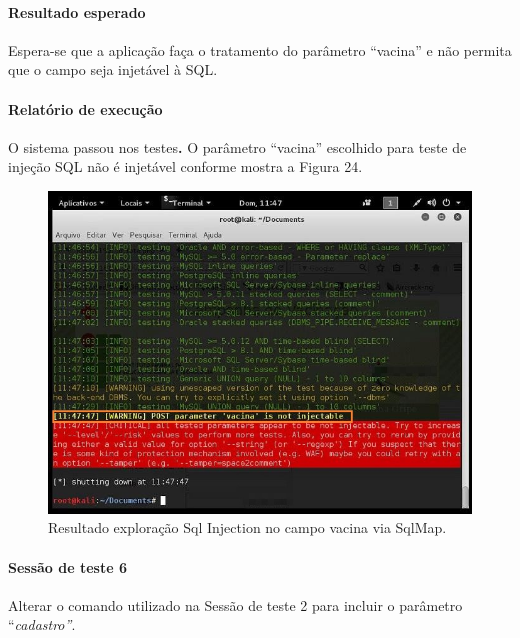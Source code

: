 \documentclass[
    12pt,               %
    openright,          %
    oneside,            %
    a4paper,            %
    section=TITLE,     %
    english,            %
    french,             %
    spanish,            %
    brazil              %
    ]{abntex2}
\begin{document}
\paragraph*{Resultado esperado}

Espera-se que a aplicação faça o tratamento do parâmetro \textquotedblleft{}vacina\textquotedblright{} e não permita que o campo seja injetável à SQL.



\paragraph*{Relatório de execução}

O sistema passou nos testes\textbf{. }O parâmetro \textquotedblleft{}vacina\textquotedblright{} escolhido para teste de injeção SQL não é injetável conforme mostra a Figura 24.





\begin{figure}[htp]
\centering
\caption{Resultado exploração Sql Injection no campo vacina via SqlMap.}
\includegraphics[width=447px]{image20.jpeg}
\end{figure}
\ifdefined\FloatBarrier \FloatBarrier \fi



\paragraph*{Sessão de teste 6}

Alterar o comando utilizado na Sessão de teste 2 para incluir o parâmetro \textquotedblleft{}\emph{cadastro\textquotedblright{}}.
\end{document}
